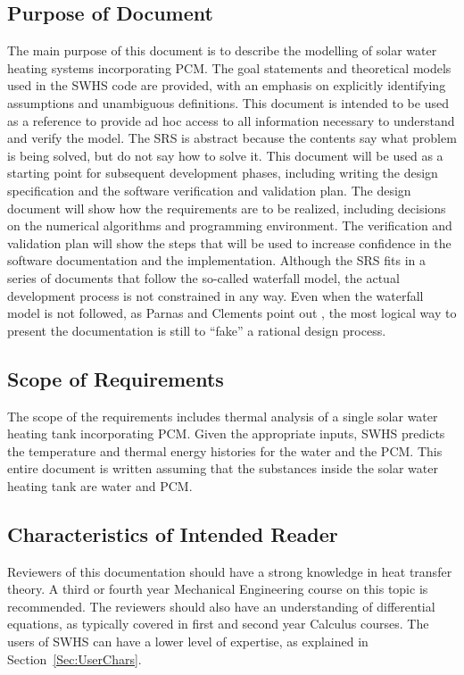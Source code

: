 \documentclass[12pt]{article}
\begin{document}
\subsection{Purpose of Document}
\label{Sec:DocPurpose}
The main purpose of this document is to describe the modelling of solar water heating systems incorporating PCM. The goal statements and theoretical models used in the SWHS code are provided, with an emphasis on explicitly identifying assumptions and unambiguous definitions. This document is intended to be used as a reference to provide ad hoc access to all information necessary to understand and verify the model. The SRS is abstract because the contents say what problem is being solved, but do not say how to solve it.
This document will be used as a starting point for subsequent development phases, including writing the design specification and the software verification and validation plan. The design document will show how the requirements are to be realized, including decisions on the numerical algorithms and programming environment. The verification and validation plan will show the steps that will be used to increase confidence in the software documentation and the implementation. Although the SRS fits in a series of documents that follow the so-called waterfall model, the actual development process is not constrained in any way. Even when the waterfall model is not followed, as Parnas and Clements point out \cite{parnasClements1986}, the most logical way to present the documentation is still to ``fake'' a rational design process.
\subsection{Scope of Requirements}
\label{Sec:ReqsScope}
The scope of the requirements includes thermal analysis of a single solar water heating tank incorporating PCM. Given the appropriate inputs, SWHS predicts the temperature and thermal energy histories for the water and the PCM. This entire document is written assuming that the substances inside the solar water heating tank are water and PCM.
\subsection{Characteristics of Intended Reader}
\label{Sec:ReaderChars}
Reviewers of this documentation should have a strong knowledge in heat transfer theory. A third or fourth year Mechanical Engineering course on this topic is recommended. The reviewers should also have an understanding of differential equations, as typically covered in first and second year Calculus courses. The users of SWHS can have a lower level of expertise, as explained in Section~\ref{Sec:UserChars}.
\end{document}
